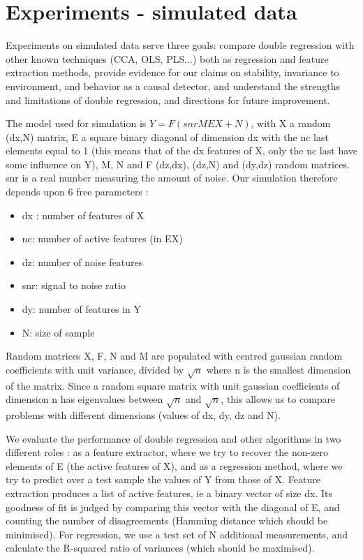 \documentclass{article}
\begin{document}
\section{Experiments - simulated data}
Experiments on simulated data serve three goals: compare double regression with other known techniques (CCA, OLS, PLS...) both as regression and feature extraction methods, provide evidence for our claims on stability, invariance to environment, and behavior as a causal detector, and understand the strengths and limitations of double regression, and directions for future improvement.

The model used for simulation is $Y=F(snr MEX+N)$, with X a random (dx,N) matrix, E a square binary diagonal of dimension dx with the nc last elements equal to 1 (this means that of the dx features of X, only the nc last have some influence on Y), M, N and F (dz,dx), (dz,N) and (dy,dz) random matrices. snr is a real number measuring the amount of noise. Our simulation therefore depends upon 6 free parameters : 

\begin{itemize}
\item dx : number of features of X
\item nc: number of active features (in EX)
\item dz: number of noise features
\item snr: signal to noise ratio
\item dy: number of features in Y
\item N: size of sample
\end{itemize}

Random matrices X, F, N and M are populated with centred gaussian random coefficients with unit variance, divided by $ \surd n$ where n is the smallest dimension of the matrix. Since a random square matrix with unit gaussian coefficients of dimension n has eigenvalues between $ \surd n $ and $\surd n $, this allows us to compare problems with different dimensions (values of dx, dy, dz and N). 

We evaluate the performance of double regression and other algorithms in two different roles : as a feature extractor, where we try to recover the non-zero elements of E (the active features of X), and as a regression method, where we try to predict over a test sample the values of Y from those of X. Feature extraction produces a list of active features, ie a binary vector of size dx. Its goodness of fit is judged by comparing this vector with the diagonal of E, and counting the number of disagreements (Hamming distance which should be minimised). For regression, we use a test set of N additional measurements, and calculate the R-squared ratio of variances (which should be maximised).
\end{document}

